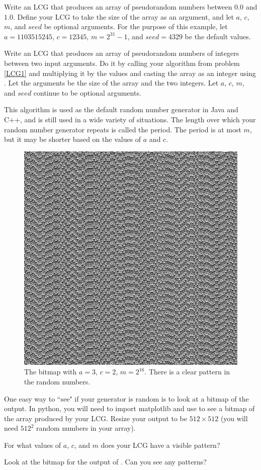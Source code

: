 \begin{problem}\label{LCG1}
Write an LCG that produces an array of pseudorandom numbers between $0.0$ and $1.0$.
Define your LCG to take the size of the array as an argument, and let $a$, $c$, $m$, and $seed$ be optional arguments.
For the purpose of this example, let $a=1103515245$, $c=12345$, $m=2^{31}-1$, and $seed=4329$ be the default values.
\end{problem}

\begin{problem}
Write an LCG that produces an array of pseudorandom numbers of integers between two input arguments.
Do it by calling your algorithm from problem \ref{LCG1} and multiplying it by the values and casting the array as an integer using .
Let the arguments be the size of the array and the two integers.
Let $a$, $c$, $m$, and $seed$ continue to be optional arguments.
\end{problem}

This algorithm is used as the default random number generator in Java and C++, and is still used in a wide variety of situations.
The length over which your random number generator repeats is called the period.
The period is at most $m$, but it may be shorter based on the values of $a$ and $c$.

\begin{figure}
\includegraphics[width=.4\textwidth]{PRNG1.png}
\caption{
The bitmap with $a=3$, $c=2$, $m=2^{16}$.
There is a clear pattern in the random numbers.}
\end{figure}

One easy way to ``see" if your generator is random is to look at a bitmap of the output.
In python, you will need to import matplotlib and use  to see a bitmap of the array produced by your LCG.
Resize your output to be $512 \times 512$ (you will need $512^2$ random numbers in your array).



\begin{problem}
For what values of $a$, $c$, and $m$ does your LCG have a visible pattern?

Look at the bitmap for the output of .
Can you see any patterns?
\end{problem}


